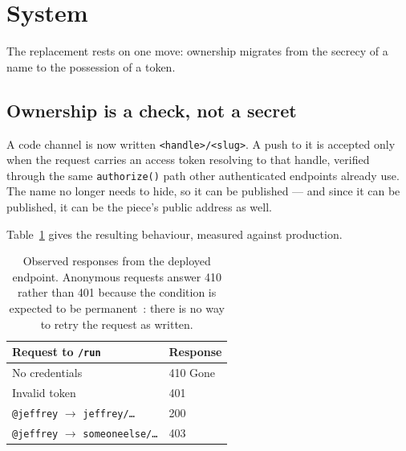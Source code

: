 \documentclass[10pt,letterpaper,twocolumn]{article}
\newcommand{\code}[1]{\texttt{#1}}
\begin{document}
\section{System}
\label{sec:system}

The replacement rests on one move: ownership migrates from the secrecy of a name
to the possession of a token.

\subsection{Ownership is a check, not a secret}

A code channel is now written \code{<handle>/<slug>}. A push to it is accepted
only when the request carries an access token resolving to that handle, verified
through the same \code{authorize()} path other authenticated endpoints already
use. The name no longer needs to hide, so it can be published --- and since it
can be published, it can be the piece's public address as well.

Table~\ref{tab:run} gives the resulting behaviour, measured against production.

\begin{table}[t]
\centering
\footnotesize
\begin{tabularx}{\columnwidth}{@{}Xl@{}}
\toprule
\textbf{Request to \code{/run}} & \textbf{Response} \\
\midrule
No credentials & 410 Gone \\
Invalid token & 401 \\
\code{@jeffrey} $\rightarrow$ \code{jeffrey/\dots} & 200 \\
\code{@jeffrey} $\rightarrow$ \code{someoneelse/\dots} & 403 \\
\bottomrule
\end{tabularx}
\caption{Observed responses from the deployed endpoint. Anonymous requests
answer 410 rather than 401 because the condition is expected to be
permanent~\citep{rfc9110}: there is no way to retry the request as written.}
\label{tab:run}
\end{table}
\end{document}

